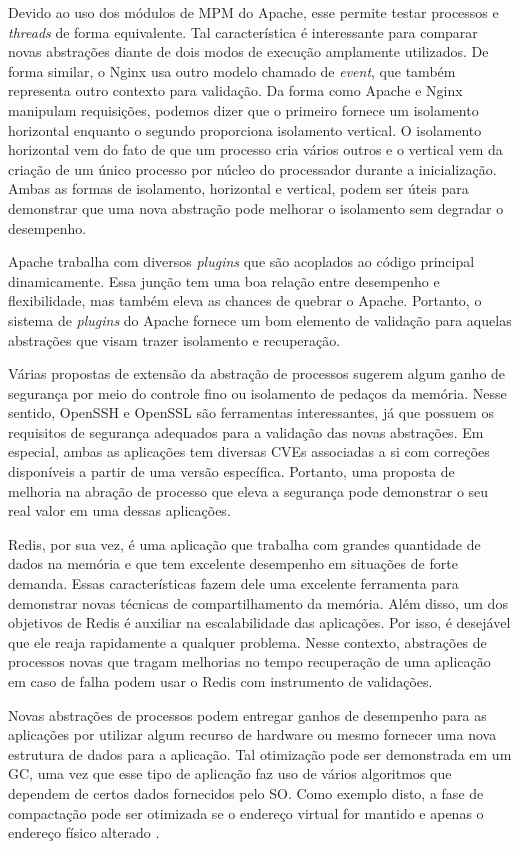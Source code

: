 Devido ao uso dos módulos de MPM do Apache, esse permite testar processos e
\emph{threads} de forma equivalente.  Tal característica é interessante para
comparar novas abstrações diante de dois modos de execução amplamente
utilizados. De forma similar, o Nginx usa outro modelo chamado de \emph{event},
que também representa outro contexto para validação. Da forma como Apache e
Nginx manipulam requisições, podemos dizer que o primeiro fornece um isolamento
horizontal enquanto o segundo proporciona isolamento vertical. O isolamento
horizontal vem do fato de que um processo cria vários outros e o vertical vem
da criação de um único processo por núcleo do processador durante a
inicialização. Ambas as formas de isolamento, horizontal e vertical,  podem ser
úteis para demonstrar que uma nova abstração pode melhorar o isolamento sem
degradar o desempenho.

Apache trabalha com diversos \emph{plugins} que são acoplados ao código
principal dinamicamente. Essa junção tem uma boa relação entre desempenho e
flexibilidade, mas também eleva as chances de quebrar o Apache.  Portanto, o
sistema de \emph{plugins} do Apache fornece um bom elemento de validação para
aquelas abstrações que visam trazer isolamento e recuperação.

Várias propostas de extensão da abstração de processos sugerem algum ganho de
segurança por meio do controle fino ou isolamento de pedaços da memória. Nesse
sentido, OpenSSH e OpenSSL são ferramentas interessantes, já que possuem os
requisitos de segurança adequados para a validação das novas abstrações. Em
especial, ambas as aplicações tem diversas CVEs associadas a si com correções
disponíveis a partir de uma versão específica. Portanto, uma proposta de
melhoria na abração de processo que eleva a segurança pode demonstrar o seu
real valor em uma dessas aplicações.

Redis, por sua vez, é uma aplicação que trabalha com grandes quantidade de
dados na memória e que tem excelente desempenho em situações de forte
demanda. Essas características fazem dele uma excelente ferramenta para
demonstrar novas técnicas de compartilhamento da memória. Além disso, um dos
objetivos de Redis é auxiliar na escalabilidade das aplicações. Por isso, é
desejável que ele reaja rapidamente a qualquer problema. Nesse contexto,
abstrações de processos novas que tragam melhorias no tempo recuperação de uma
aplicação em caso de falha podem usar o Redis com instrumento de validações.

Novas abstrações de processos podem entregar ganhos de desempenho para as
aplicações por utilizar algum recurso de hardware ou mesmo fornecer uma nova
estrutura de dados para a aplicação. Tal otimização pode ser demonstrada em um
GC, uma vez que esse tipo de aplicação faz uso de vários algoritmos que dependem
de certos dados fornecidos pelo SO. Como exemplo disto, a fase de compactação
pode ser otimizada se o endereço virtual for mantido e apenas o endereço físico
alterado \citep{pauseless}.

